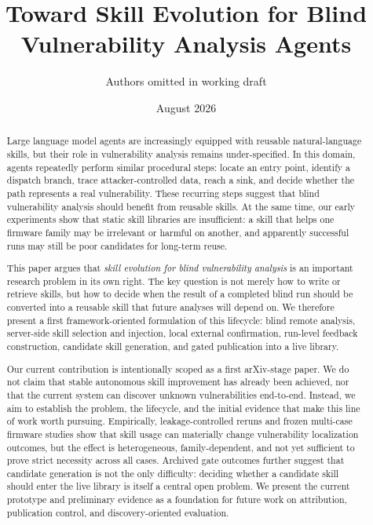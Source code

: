 \documentclass[11pt]{article}
\title{Toward Skill Evolution for Blind Vulnerability Analysis Agents}
\author{Authors omitted in working draft}
\date{August 2026}
\begin{document}
\maketitle

\begin{abstract}
Large language model agents are increasingly equipped with reusable natural-language
skills, but their role in vulnerability analysis remains under-specified.  In this
domain, agents repeatedly perform similar procedural steps: locate an entry point,
identify a dispatch branch, trace attacker-controlled data, reach a sink, and decide
whether the path represents a real vulnerability.  These recurring steps suggest that
blind vulnerability analysis should benefit from reusable skills.  At the same time,
our early experiments show that static skill libraries are insufficient: a skill that
helps one firmware family may be irrelevant or harmful on another, and apparently
successful runs may still be poor candidates for long-term reuse.

This paper argues that \emph{skill evolution for blind vulnerability analysis} is an
important research problem in its own right.  The key question is not merely how to
write or retrieve skills, but how to decide when the result of a completed blind run
should be converted into a reusable skill that future analyses will depend on.  We
therefore present a first framework-oriented formulation of this lifecycle: blind remote
analysis, server-side skill selection and injection, local external confirmation,
run-level feedback construction, candidate skill generation, and gated publication into
a live library.

Our current contribution is intentionally scoped as a first arXiv-stage paper.  We do
not claim that stable autonomous skill improvement has already been achieved, nor that
the current system can discover unknown vulnerabilities end-to-end.  Instead, we aim to
establish the problem, the lifecycle, and the initial evidence that make this line of
work worth pursuing.  Empirically, leakage-controlled reruns and frozen multi-case
firmware studies show that skill usage can materially change vulnerability localization
outcomes, but the effect is heterogeneous, family-dependent, and not yet sufficient to
prove strict necessity across all cases.  Archived gate outcomes further suggest that
candidate generation is not the only difficulty: deciding whether a candidate skill
should enter the live library is itself a central open problem.  We present the current
prototype and preliminary evidence as a foundation for future work on attribution,
publication control, and discovery-oriented evaluation.
\end{abstract}
\end{document}
